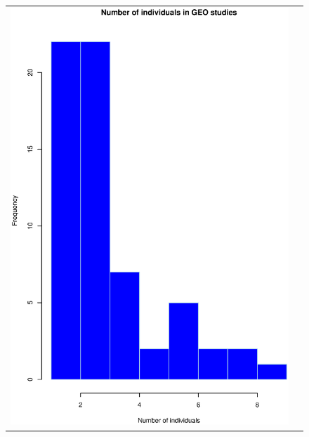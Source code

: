 \documentclass[a4paper]{article}
\begin{document}
\begin{figure}[h!]
\begin{tabular}{cc}
\includegraphics[scale=0.3]{GEOind.eps}\\

\end{tabular}
\end{figure}
\end{document}
